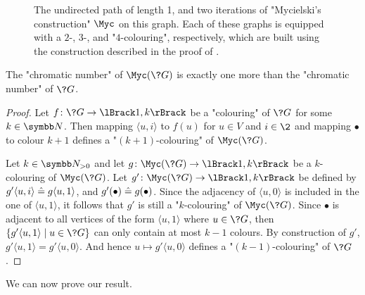 \begin{figure}
	\centering
	\begin{tikzpicture}
		
	\end{tikzpicture}
	\caption{
		\AP\label{fig:Mycielski}
		The undirected path of length 1,
		and two iterations of "Mycielski's construction" $\Myc$ on this graph.
		Each of these graphs is equipped with a $2$-, $3$-, and "$4$-colouring", respectively, 
		which are built using the construction described in the proof
		of .
	}
\end{figure}

\begin{property}
	\label{prop:chromatic-number}
	The "chromatic number" of $\Myc(\?G)$
	is exactly one more than the "chromatic number" of $\?G$.
\end{property}

\begin{proof}
  Let $f\colon \?G \to \lBrack 1,k \rBrack$ be a "colouring" of $\?G$ for some $k\in \N$.
  Then mapping $\langle u, i \rangle$ to $f(u)$ for $u \in V$ and $i \in \2$
  and mapping $\bullet$ to colour $k+1$ defines a "$(k+1)$-colouring" of $\Myc(\?G)$.

  Let $k \in \Np$ and let $g\colon \Myc(\?G) \to \lBrack 1,k\rBrack$ be a
  $k$-colouring of $\Myc(\?G)$.
  Let $g'\colon \Myc(\?G) \to \lBrack 1,k\rBrack$
  be defined by $g'\langle u,i\rangle \defeq g\langle u,1 \rangle$,
  and $g'(\bullet) \defeq g(\bullet)$.
  Since the adjacency of $\langle u,0 \rangle$ is included in the
  one of $\langle u,1 \rangle$, it follows that $g'$ is still a "$k$-colouring"
  of $\Myc(\?G)$. Since $\bullet$ is adjacent to all vertices of the form $\langle u, 1\rangle$
  where $u\in \?G$, then $\{g'\langle u, 1\rangle \mid u \in \?G\}$ can only contain at most $k-1$ colours.
  By construction of $g'$, $g'\langle u, 1\rangle = g'\langle u, 0\rangle$.
  And hence $u \mapsto g' \langle u,0 \rangle$ defines a "$(k-1)$-colouring" of $\?G$.
\end{proof}

We can now prove our result.

